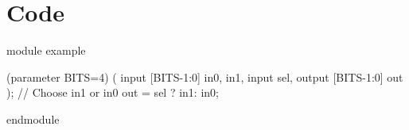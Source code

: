\documentclass[]{report}
\begin{document}
	\section*{Code}
	
	module example
	
	(parameter BITS=4) 
	(				   \newline
	input [BITS-1:0] in0, in1, \newline
	input sel,                 \newline
	output [BITS-1:0] out      \newline
	);                         \newline
	// Choose in1 or in0       \newline
	out = sel ? in1: in0;      \newline

	endmodule  
	
	
\end{document}
